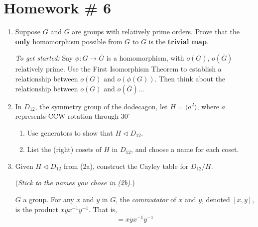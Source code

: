 \section{Homework \# 6}
\label{sec:HW6}
\begin{enumerate}
    \item Suppose $ G $ and $ \bar{G} $ are groups with relatively prime orders. Prove that the \textbf{only} homomorphism possible from $ G $ to $ \bar{G} $ is the \textbf{trivial map}. \\ \steezybreak
    
    \textit{To get started:} Say $ \phi: G \to \bar{G} $ is a homomorphism, with $ o(G) $, $ o(\bar{G}) $ relatively prime. Use the First Isomorphism Theorem to establish a relationship between $ o(G) $ and $ o(\phi(G)) $. Then think about the relationship between $ o(G) $ and $ o(\bar{G}) $... \\ \steezybreak
    
    \item In $ D_{12} $, the symmetry group of the dodecagon, let $ H = \langle a^2 \rangle $, where $ a $ represents CCW rotation through $ 30^\circ $
    
    \begin{enumerate}
        \item Use generators to show that $ H \triangleleft D_{12} $.
        \item List the (right) cosets of $ H $ in $ D_{12} $, and choose a name for each coset. \\ \steezybreak
    \end{enumerate}
    
    \item Given $ H \triangleleft D_{12} $ from (2a), construct the Cayley table for $ D_{12} / H $.
    
    (\textit{Stick to the names you chose in (2b)}.) \\
    
    \begin{definition}[Commutator]
        $ G $ a group. For any $ x $ and $ y $ in $ G $, the \textit{commutator} of $ x $ and $ y $, denoted $ [x,y] $, is the product $ xyx^{-1}y^{-1} $. That is,
        \begin{align*}
            [x,y] = xyx^{-1}y^{-1}
        \end{align*}
    \end{definition}
    

\end{enumerate}
